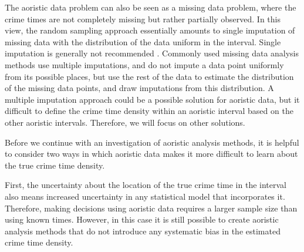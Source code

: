 The aoristic data problem can also be seen as a missing data problem, where the crime times are not completely missing but rather partially observed.  In this view, the random sampling approach essentially amounts to single imputation of missing data with the distribution of the data uniform in the interval. Single imputation is generally not recommended \citep{van2018flexible}. Commonly used missing data analysis methods use multiple imputations, and do not impute a data point uniformly from its possible places, but use the rest of the data to estimate the distribution of the missing data points, and draw imputations from this distribution. A multiple imputation approach could be a possible solution for aoristic data, but it difficult to define the crime time density within an aoristic interval based on the other aoristic intervals. Therefore, we will focus on other solutions.

Before we continue with an investigation of aoristic analysis methods, it is helpful to consider two ways in which aoristic data makes it more difficult to learn about the true crime time density.

First, the uncertainty about the location of the true crime time in the interval also means increased uncertainty in any statistical model that incorporates it. Therefore, making decisions using aoristic data requires a larger sample size than using known times. However, in this case it is still possible to create aoristic analysis methods that do not introduce any systematic bias in the estimated crime time density.


